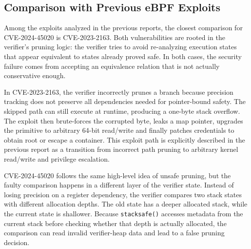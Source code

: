 \documentclass[../main.tex]{subfiles}
\begin{document}
\subsection{Comparison with Previous eBPF Exploits}

Among the exploits analyzed in the previous reports, the closest comparison for CVE-2024-45020 is CVE-2023-2163. Both vulnerabilities are rooted in the verifier's pruning logic: the verifier tries to avoid re-analyzing execution states that appear equivalent to states already proved safe. In both cases, the security failure comes from accepting an equivalence relation that is not actually conservative enough.

In CVE-2023-2163, the verifier incorrectly prunes a branch because precision tracking does not preserve all dependencies needed for pointer-bound safety. The skipped path can still execute at runtime, producing a one-byte stack overflow. The exploit then brute-forces the corrupted byte, leaks a map pointer, upgrades the primitive to arbitrary 64-bit read/write and finally patches credentials to obtain root or escape a container. This exploit path is explicitly described in the previous report as a transition from incorrect path pruning to arbitrary kernel read/write and privilege escalation.

CVE-2024-45020 follows the same high-level idea of unsafe pruning, but the faulty comparison happens in a different layer of the verifier state. Instead of losing precision on a register dependency, the verifier compares two stack states with different allocation depths. The old state has a deeper allocated stack, while the current state is shallower. Because \texttt{stacksafe()} accesses metadata from the current stack before checking whether that depth is actually allocated, the comparison can read invalid verifier-heap data and lead to a false pruning decision.
\end{document}
